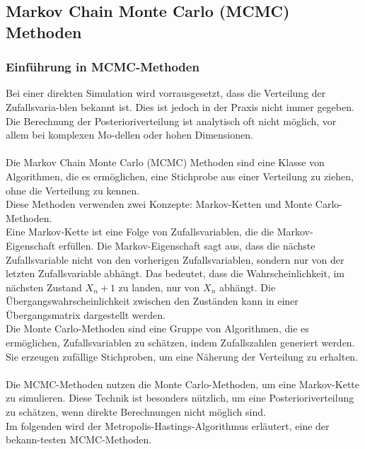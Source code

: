 \documentclass[a4paper,12pt]{article}
\begin{document}
\newpage

\subsection{Markov Chain Monte Carlo (MCMC) Methoden}
\subsubsection{Einführung in MCMC-Methoden}
Bei einer direkten Simulation wird vorrausgesetzt, dass die Verteilung der Zufallsvaria-blen bekannt ist.
Dies ist jedoch in der Praxis nicht immer gegeben.
Die Berechnung der Posterioriverteilung ist analytisch oft nicht möglich, vor allem bei komplexen Mo-dellen oder hohen Dimensionen. \\\\
Die Markov Chain Monte Carlo (MCMC) Methoden sind eine Klasse von Algorithmen, die es ermöglichen, eine Stichprobe aus einer Verteilung zu ziehen, ohne die Verteilung zu kennen. \parencite[179]{MonteCarloAlgorithmen} \\
Diese Methoden verwenden zwei Konzepte: Markov-Ketten und Monte Carlo-Methoden. \\
Eine Markov-Kette ist eine Folge von Zufallsvariablen, die die Markov-Eigenschaft erfüllen. 
Die Markov-Eigenschaft sagt aus, dass die nächste Zufallsvariable nicht von den vorherigen Zufallsvariablen, sondern nur von der letzten Zufallsvariable abhängt. 
Das bedeutet, dass die Wahrscheinlichkeit, im nächsten Zustand $X_n+1$ zu landen, nur von $X_n$ abhängt. 
Die Übergangswahrscheinlichkeit zwischen den Zuständen kann in einer Übergangsmatrix dargestellt werden. \parencite[188f.]{MonteCarloAlgorithmen} \\
Die Monte Carlo-Methoden sind eine Gruppe von Algorithmen, die es ermöglichen, Zufallsvariablen zu schätzen, indem Zufallszahlen generiert werden. 
Sie erzeugen zufällige Stichproben, um eine Näherung der Verteilung zu erhalten. \parencite[14f.]{MonteCarloAlgorithmen} \\\\
Die MCMC-Methoden nutzen die Monte Carlo-Methoden, um eine Markov-Kette zu simulieren. Diese Technik ist besonders nützlich, um eine Posterioriverteilung zu schätzen, wenn direkte Berechnungen nicht möglich sind. \parencite[179]{MonteCarloAlgorithmen} \\
Im folgenden wird der Metropolis-Hastings-Algorithmus erläutert, eine der bekann-testen MCMC-Methoden.
\newpage
\end{document}
